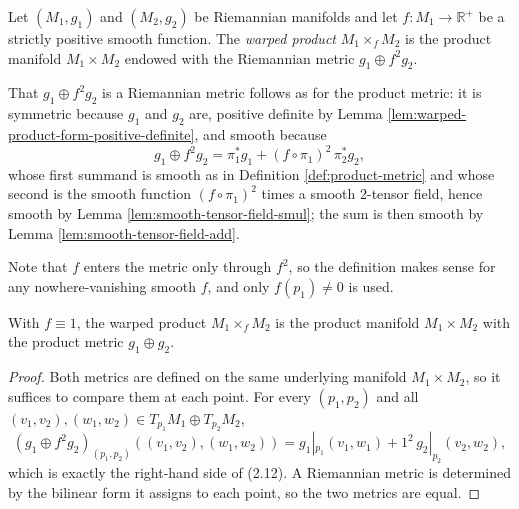 \begin{definition}
\label{def:warped-product}
\leanok
{}
Let $(M_1,g_1)$ and $(M_2,g_2)$ be Riemannian manifolds and let $f : M_1 \to \mathbb{R}^+$ be a strictly positive smooth function. The \emph{warped product} $M_1 \times_f M_2$ is the product manifold $M_1 \times M_2$ endowed with the Riemannian metric $g_1 \oplus f^2 g_2$.

That $g_1 \oplus f^2 g_2$ is a Riemannian metric follows as for the product metric: it is symmetric because $g_1$ and $g_2$ are, positive definite by Lemma \ref{lem:warped-product-form-positive-definite}, and smooth because
\[
g_1 \oplus f^2 g_2 = \pi_1^* g_1 + (f \circ \pi_1)^2\, \pi_2^* g_2,
\]
whose first summand is smooth as in Definition \ref{def:product-metric} and whose second is the smooth function $(f \circ \pi_1)^2$ times a smooth $2$-tensor field, hence smooth by Lemma \ref{lem:smooth-tensor-field-smul}; the sum is then smooth by Lemma \ref{lem:smooth-tensor-field-add}.

Note that $f$ enters the metric only through $f^2$, so the definition makes sense for any nowhere-vanishing smooth $f$, and only $f(p_1) \neq 0$ is used.
\end{definition}

\begin{proposition}
\label{prop:warped-product-constant-one}
\leanok
{}
With $f \equiv 1$, the warped product $M_1 \times_f M_2$ is the product manifold $M_1 \times M_2$ with the product metric $g_1 \oplus g_2$.
\end{proposition}

\begin{proof}
\leanok
{}
Both metrics are defined on the same underlying manifold $M_1 \times M_2$, so it suffices to compare them at each point. For every $(p_1,p_2)$ and all $(v_1,v_2), (w_1,w_2) \in T_{p_1}M_1 \oplus T_{p_2}M_2$,
\[
(g_1 \oplus f^2 g_2)_{(p_1,p_2)}((v_1,v_2),(w_1,w_2)) = g_1|_{p_1}(v_1,w_1) + 1^2\, g_2|_{p_2}(v_2,w_2),
\]
which is exactly the right-hand side of (2.12). A Riemannian metric is determined by the bilinear form it assigns to each point, so the two metrics are equal.
\end{proof}

